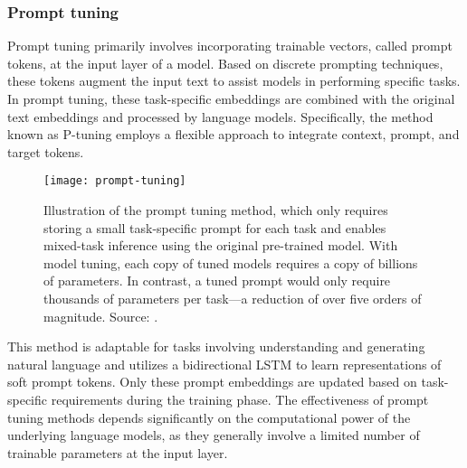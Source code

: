 \subsubsection{Prompt tuning}
\label{subsubsec:prompt-tuning}

Prompt tuning primarily involves incorporating trainable vectors, called prompt tokens, at the input layer of a model.
Based on discrete prompting techniques, these tokens augment the input text to assist models in performing specific tasks.
In prompt tuning, these task-specific embeddings are combined with the original text embeddings and processed by language models.
Specifically, the method known as P-tuning employs a flexible approach to integrate context, prompt, and target tokens.
\begin{figure}[h!]
	\centering
	\texttt{[image: prompt-tuning]}
	\caption{Illustration of the prompt tuning method, which only requires storing a small task-specific prompt for each task and enables mixed-task inference using the original pre-trained model. With model tuning, each copy of tuned models requires a copy of billions of parameters. In contrast, a tuned prompt would only require thousands of parameters per task---a reduction of over five orders of magnitude. Source: \textcite{lester2021power}.}
	\label{fig:prompt-tuning}
\end{figure}
This method is adaptable for tasks involving understanding and generating natural language and utilizes a bidirectional LSTM to learn representations of soft prompt tokens.
Only these prompt embeddings are updated based on task-specific requirements during the training phase.
The effectiveness of prompt tuning methods depends significantly on the computational power of the underlying language models, as they generally involve a limited number of trainable parameters at the input layer.

